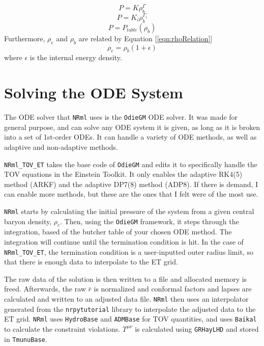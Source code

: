 \begin{equation}\label{eqn:EOS:S}
P=K\rho_b^{\Gamma}
\end{equation}
\begin{equation}\label{eqn:EOS:P}
P=K_i\rho_b^{\Gamma_i}
\end{equation}
\begin{equation}\label{eqn:EOS:T}
P=P_{table}(\rho_b)
\end{equation}
Furthermore, $\rho_e$ and $\rho_b$ are related by Equation [\ref{eqn:rhoRelation}]
\begin{equation}\label{eqn:rhoRelation}
\rho_e = \rho_b(1+\epsilon)
\end{equation}
where $\epsilon$ is the internal energy density.

\section{Solving the ODE System}

The ODE solver that {\tt NRml} uses is the {\tt OdieGM} ODE solver. It was made for general purpose, and can solve any ODE system it is given, as long as it is broken into a set of 1st-order ODEs. It can handle a variety of ODE methods, as well as adaptive and non-adaptive methods.

{\tt NRml\_TOV\_ET} takes the base code of {\tt OdieGM} and edits it to specifically handle the TOV equations in the Einstein Toolkit. It only enables the adaptive RK4(5) method (ARKF) and the adaptive DP7(8) method (ADP8). If there is demand, I can enable more methods, but these are the ones that I felt were of the most use.

{\tt NRml} starts by calculating the initial pressure of the system from a given central baryon density, $\rho_c$. Then, using the {\tt OdieGM} framework, it steps through the integration, based of the butcher table of your chosen ODE method. The integration will continue until the termination condition is hit. In the case of {\tt NRml\_TOV\_ET}, the termination condition is a user-inputted outer radius limit, so that there is enough data to interpolate to the ET grid.

The raw data of the solution is then written to a file and allocated memory is freed. Afterwards, the raw $\bar{r}$ is normalized and conformal factors and lapses are calculated and written to an adjusted data file. {\tt NRml} then uses an interpolator generated from the {\tt nrpytutorial}\cite{NRpy} library to interpolate the adjusted data to the ET grid. {\tt NRml} uses {\tt HydroBase} and {\tt ADMBase} for TOV quantities, and uses {\tt Baikal} to calculate the constraint violations. $T^{\mu\nu}$ is calculated using {\tt GRHayLHD} and stored in {\tt TmunuBase}.

